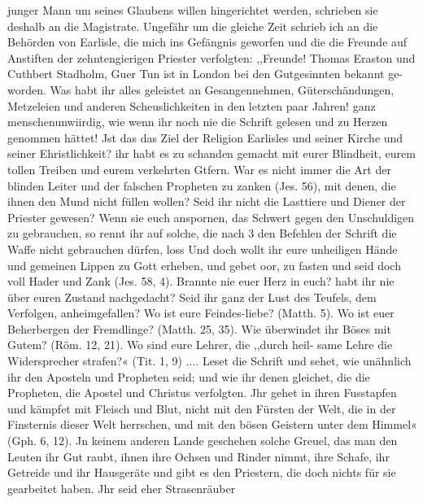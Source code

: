 {%
junger Mann um seines Glaubens willen hingerichtet werden,
schrieben sie deshalb an die Magistrate.
Ungefähr um die gleiche Zeit schrieb ich an die Behörden
von Earlisle, die mich ins Gefängnis geworfen und die die
Freunde auf Anstiften der zehntengierigen Priester verfolgten:
,,Freunde! Thomas Eraston und Cuthbert Stadholm,
Guer Tun ist in London bei den Gutgesinnten bekannt ge-
worden. Was habt ihr alles geleistet an Gesangennehmen,
Güterschändungen, Metzeleien und anderen Scheuslichkeiten in den
letzten paar Jahren! ganz menschenunwiirdig, wie wenn ihr
noch nie die Schrift gelesen und zu Herzen genommen hättet!
Jst das das Ziel der Religion Earlisles und seiner Kirche und
seiner Ehristlichkeit? ihr habt es zu schanden gemacht mit eurer
Blindheit, eurem tollen Treiben und eurem verkehrten Gtfern.
War es nicht immer die Art der blinden Leiter und der falschen
Propheten zu zanken (Jes. 56), mit denen, die ihnen den Mund
nicht füllen wollen? Seid ihr nicht die Lasttiere und Diener der
Priester gewesen? Wenn sie euch anspornen, das Schwert gegen
den Unschuldigen zu gebrauchen, so rennt ihr auf solche, die nach 3
den Befehlen der Schrift die Waffe nicht gebrauchen dürfen, loss
Und doch wollt ihr eure unheiligen Hände und gemeinen Lippen
zu Gott erheben, und gebet oor, zu fasten und seid doch voll
Hader und Zank (Jes. 58, 4). Brannte nie euer Herz in euch?
habt ihr nie über euren Zustand nachgedacht? Seid ihr ganz
der Lust des Teufels, dem Verfolgen, anheimgefallen? Wo ist
eure Feindes-liebe? (Matth. 5). Wo ist euer Beherbergen der
Fremdlinge? (Matth. 25, 35). Wie überwindet ihr Böses mit
Gutem? (Röm. 12, 21). Wo sind eure Lehrer, die ,,durch heil-
same Lehre die Widersprecher strafen?« (Tit. 1, 9) .... Leset die
Schrift und sehet, wie unähnlich ihr den Aposteln und Propheten
seid; und wie ihr denen gleichet, die die Propheten, die Apostel
und Christus verfolgten. Jhr gehet in ihren Fusstapfen und
kämpfet mit Fleisch und Blut, nicht mit den Fürsten der Welt,
die in der Finsternis dieser Welt herrschen, und mit den bösen
Geistern unter dem Himmel« (Gph. 6, 12). Jn keinem anderen
Lande geschehen solche Greuel, das man den Leuten ihr Gut
raubt, ihnen ihre Ochsen und Rinder nimmt, ihre Schafe, ihr
Getreide und ihr Hausgeräte und gibt es den Priestern, die doch
nichts für sie gearbeitet haben. Jhr seid eher Strasenräuber


}
